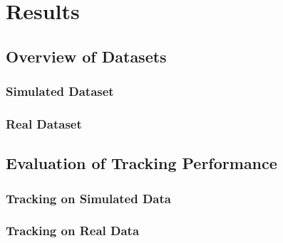 \chapter{Results} \label{chapter:5}

\section{Overview of Datasets}

\subsection{Simulated Dataset}

\subsection{Real Dataset}

\section{Evaluation of Tracking Performance}

\subsection{Tracking on Simulated Data}

\subsection{Tracking on Real Data}
 